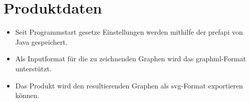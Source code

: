 \chapter{Produktdaten}

\begin{itemize}
\item Seit Programmstart gesetze Einstellungen werden mithilfe der \gls{prefapi} von Java gespeichert.
\item Als Inputformat für die zu zeichnenden Graphen wird das \gls{graphml}-Format unterstützt.
\item Das Produkt wird den resultierenden Graphen als \gls{svg}-Format exportieren können.
\end{itemize}